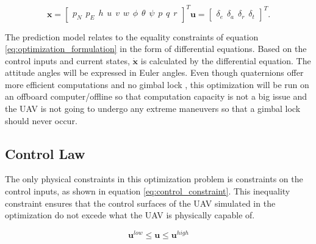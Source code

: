 \begin{subequations}
\begin{equation}
	\mathbf{x} =
	\begin{bmatrix}
		p_N \hspace{5pt} p_E \hspace{5pt} h \hspace{5pt}
		u \hspace{5pt} v \hspace{5pt} w \hspace{5pt}
		\phi \hspace{5pt} \theta \hspace{5pt} \psi \hspace{5pt}
		p \hspace{5pt} q \hspace{5pt} r
	\end{bmatrix}^T
\end{equation}
\begin{equation}
	\mathbf{u} =
	\begin{bmatrix}
		\delta_e \hspace{5pt} \delta_a \hspace{5pt} \delta_r \hspace{5pt} \delta_t
	\end{bmatrix}^T.
\end{equation}
\end{subequations}

The prediction model relates to the equality constraints of equation \ref{eq:optimization_formulation} in the form of differential equations. Based on the control inputs and current states, $\mathbf{\dot{x}}$ is calculated by the differential equation. The attitude angles will be expressed in Euler angles. Even though quaternions offer more efficient computations and no gimbal lock \cite{uavBEARD}, this optimization will be run on an offboard computer/offline so that computation capacity is not a big issue and the UAV is not going to undergo any extreme maneuvers so that a gimbal lock should never occur.


\subsection{Control Law}

The only physical constraints in this optimization problem is constraints on the control inputs, as shown in equation \ref{eq:control_constraint}. This inequality constraint ensures that the control surfaces of the UAV simulated in the optimization do not excede what the UAV is physically capable of.

\begin{equation}
	\label{eq:control_constraint}
	\mathbf{u}^{low} \leq \mathbf{u} \leq \mathbf{u}^{high}
\end{equation}
